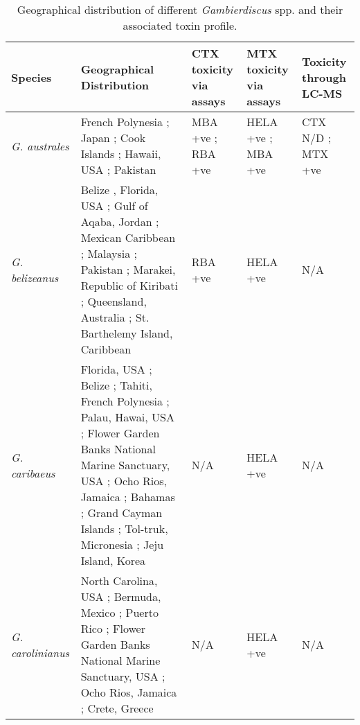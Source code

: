 \documentclass[12pt]{article}
\begin{document}
	\begin{longtable}{ | p{2cm} | p{5.5cm} | p{2.3cm} | p{2.3cm} | p{2.3cm} | }
	\caption{Geographical distribution of different \emph{Gambierdiscus} spp. and their associated toxin profile.} \\
	\hline
	\textbf{Species} & \textbf{Geographical Distribution} & \textbf{CTX toxicity via assays} & \textbf{MTX toxicity via assays} & \textbf{Toxicity through LC-MS} \\
	\hline
	\emph{G. australes} & French Polynesia \cite{chinain1999morphology}; Japan \cite{nishimura2013genetic}; Cook Islands \cite{rhodes2010toxic}; Hawaii, USA \cite{litaker2009taxonomy}; Pakistan \cite{munir2011occurrence} & MBA +ve \cite{rhodes2010toxic}; RBA +ve \cite{chinain2010growth} & HELA +ve \cite{holland2013differences}; MBA +ve \cite{rhodes2010toxic} & CTX N/D \cite{}; MTX +ve \cite{}\\
	\hline
	\emph{G. belizeanus} & Belize \cite{faust1995observation}, Florida, USA \cite{litaker2009taxonomy}; Gulf of Aqaba, Jordan \cite{saburova2013new}; Mexican Caribbean \cite{hernandez2004species}; Malaysia \cite{leaw2011first}; Pakistan \cite{munir2011occurrence}; Marakei, Republic of Kiribati \cite{xu2014distribution}; Queensland, Australia \cite{}; St. Barthelemy Island, Caribbean \cite{litaker2010global} & RBA +ve \cite{chinain2010growth} & HELA +ve \cite{holland2013differences} & N/A \\ %
	\hline
	\emph{G. caribaeus} & Florida, USA \cite{litaker2009taxonomy}; Belize \cite{litaker2009taxonomy}; Tahiti, French Polynesia \cite{litaker2009taxonomy}; Palau, Hawai, USA \cite{litaker2009taxonomy}; Flower Garden Banks National Marine Sanctuary, USA \cite{holland2013differences}; Ocho Rios, Jamaica \cite{}; Bahamas \cite{litaker2010global}; Grand Cayman Islands \cite{}; Tol-truk, Micronesia \cite{litaker2010global}; Jeju Island, Korea \cite{jeong2012first} & N/A & HELA +ve \cite{holland2013differences} & N/A \\
	\hline
	\emph{G. carolinianus} & North Carolina, USA \cite{litaker2009taxonomy}; Bermuda, Mexico \cite{litaker2010global}; Puerto Rico \cite{holland2013differences}; Flower Garden Banks National Marine Sanctuary, USA \cite{holland2013differences}; Ocho Rios, Jamaica \cite{holland2013differences}; Crete, Greece \cite{holland2013differences} & N/A & HELA +ve \cite{holland2013differences} & N/A\\
	\hline

\end{longtable}
\end{document}

